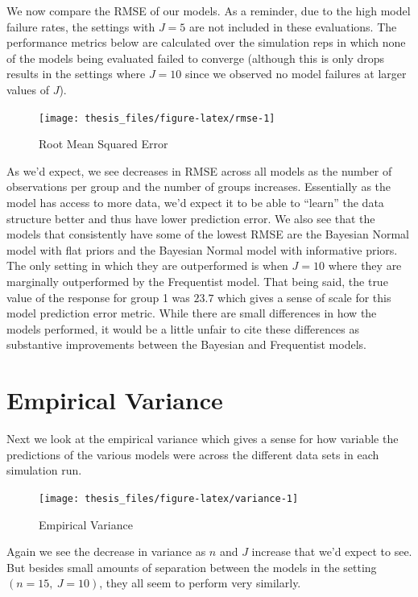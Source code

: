\documentclass[12pt,twoside]{reedthesis}
\begin{document}
We now compare the RMSE of our models. As a reminder, due to the high model failure rates, the settings with \(J = 5\) are not included in these evaluations. The performance metrics below are calculated over the simulation reps in which none of the models being evaluated failed to converge (although this is only drops results in the settings where \(J = 10\) since we observed no model failures at larger values of \(J\)).
\begin{figure}

{\centering \texttt{[image: thesis\_files/figure-latex/rmse-1]} 

}

\caption{Root Mean Squared Error}\label{fig:rmse}
\end{figure}
As we'd expect, we see decreases in RMSE across all models as the number of observations per group and the number of groups increases. Essentially as the model has access to more data, we'd expect it to be able to ``learn'' the data structure better and thus have lower prediction error. We also see that the models that consistently have some of the lowest RMSE are the Bayesian Normal model with flat priors and the Bayesian Normal model with informative priors. The only setting in which they are outperformed is when \(J = 10\) where they are marginally outperformed by the Frequentist model. That being said, the true value of the response for group 1 was \(23.7\) which gives a sense of scale for this model prediction error metric. While there are small differences in how the models performed, it would be a little unfair to cite these differences as substantive improvements between the Bayesian and Frequentist models.

\hypertarget{empirical-variance}{%
\section{Empirical Variance}\label{empirical-variance}}

Next we look at the empirical variance which gives a sense for how variable the predictions of the various models were across the different data sets in each simulation run.
\begin{figure}

{\centering \texttt{[image: thesis\_files/figure-latex/variance-1]} 

}

\caption{Empirical Variance}\label{fig:variance}
\end{figure}
Again we see the decrease in variance as \(n\) and \(J\) increase that we'd expect to see. But besides small amounts of separation between the models in the setting \((n = 15, \ J = 10)\), they all seem to perform very similarly.
\end{document}
